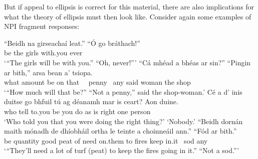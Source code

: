 \documentclass[output=paper,colorlinks,citecolor=brown]{langscibook}
\begin{document}
But if appeal to ellipsis is correct for this material, there are also implications for what the theory of ellipsis must then look like. Consider again some examples of NPI fragment responses:

\ea\label{ex:sod}
\ea
\gll “Beidh na girseachaí leat.” “Ó {go bráthach!}”\\
     {be\fut} the girls with.you {} ever \\
\glt `“The girls will be with you.”{\quad} “Oh, never!”'
\ex
\gll “Cá   mhéad   a     bhéas    ar sin?” “Pingin {ar bith},” arsa bean a' tsiopa. \\
     what amount {\go} {be\pres} on that  {\ \ penny} {\ any}  said woman the {shop\gen} \\
\glt `“How much will that be?”  “Not a penny,” said the shop-woman.' 
\ex
\gll Cé a d' inis duitse go bhfuil tú ag déanamh mar is ceart? Aon duine. \\
     who {\aLgloss}  {\did} {tell\past} to.you {\go} {be\pres} you {\prog} {do\vn} as is right one person\\
\glt `Who told you that you were doing the right thing?' `Nobody.' 
\ex
\gll “Beidh dornán maith mónadh de dhíobháil ortha le teinte a choinneáil ann.” {\quad} “Fód {ar bith}.”\\
     {be\fut} quantity good {peat\gen} of need on.them to fires {\vce} {keep\vn} in.it {} {\ sod} any \\
\glt `“They'll need a lot of turf (peat) to keep the fires going in it.”  “Not a sod.”'
\z
\z

            
\end{document}
